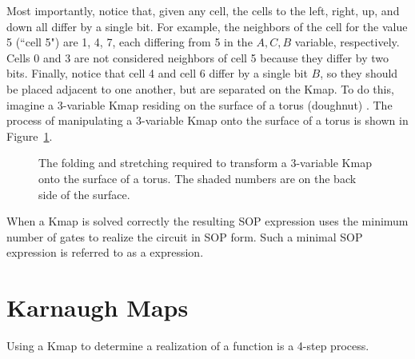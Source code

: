 Most importantly, notice that, given any cell, the cells
to the left, right, up, and down all differ by a single
bit.  For example, the neighbors of the cell for the
value 5 (``cell 5") are 1, 4, 7,
each differing from 5 in the $A,C,B$ variable, respectively.
Cells 0 and 3 are not considered neighbors of cell 5 because
they differ by two bits.  Finally, notice that cell 4 and cell 6
differ by a single bit $B$, so they should be placed adjacent
to one another, but are separated on the Kmap.  To do this,
imagine a 3-variable Kmap residing on the surface of a
torus (doughnut) .  The process of manipulating a
3-variable Kmap onto the surface of a torus is shown in
Figure~\ref{fig:minimizationTorus}.

\begin{figure}[ht]
\caption{The folding and stretching required to transform
a 3-variable Kmap onto the surface of a torus.  The shaded
numbers are on the back side of the surface.}
\label{fig:minimizationTorus}
\end{figure}

When a Kmap is solved correctly the resulting SOP expression
uses the minimum number of gates to realize the circuit
in SOP form.  Such a minimal SOP expression is referred
to as a \SOPmin {} expression.

\section{Karnaugh Maps}
Using a Kmap to determine a \SOPmin realization of a function
is a 4-step process.

